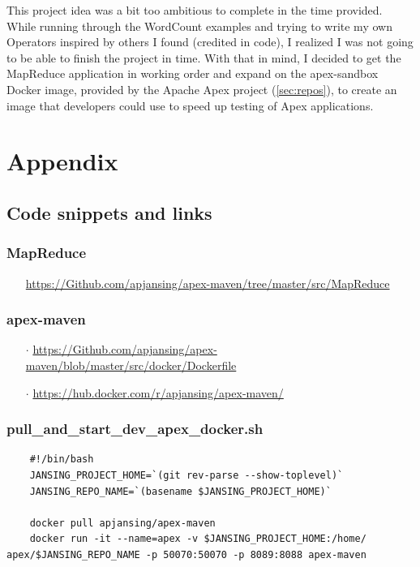 \documentclass[final]{IEEEtran}
\begin{document}
This project idea was a bit too ambitious to complete in the time provided. While running through the WordCount examples and trying to write my own Operators inspired by others I found (credited in code), I realized I was not going to be able to finish the project in time. With that in mind, I decided to get the MapReduce application in working order and expand on the apex-sandbox Docker image, provided by the Apache Apex project (\ref{sec:repos}), to create an image that developers could use to speed up testing of Apex applications.

\newpage
\section{Appendix}

\subsection{Code snippets and links}
  \subsubsection{MapReduce}\label{sec:map-reduce}
\begin{enumerate}
  \item[] \url{https://Github.com/apjansing/apex-maven/tree/master/src/MapReduce}
\end{enumerate}

  \subsubsection{apex-maven}\label{sec:apex-maven}
  \begin{enumerate}
    \item[$\cdot$] \url{https://Github.com/apjansing/apex-maven/blob/master/src/docker/Dockerfile}
    \item[$\cdot$] \url{https://hub.docker.com/r/apjansing/apex-maven/}
  \end{enumerate}
  
  \subsubsection{pull\_and\_start\_dev\_apex\_docker.sh}\label{sec:start-script}
  \begin{lstlisting}
    #!/bin/bash
    JANSING_PROJECT_HOME=`(git rev-parse --show-toplevel)`
    JANSING_REPO_NAME=`(basename $JANSING_PROJECT_HOME)`
    
    docker pull apjansing/apex-maven
    docker run -it --name=apex -v $JANSING_PROJECT_HOME:/home/ apex/$JANSING_REPO_NAME -p 50070:50070 -p 8089:8088 apex-maven
  \end{lstlisting}
  
\end{document}
